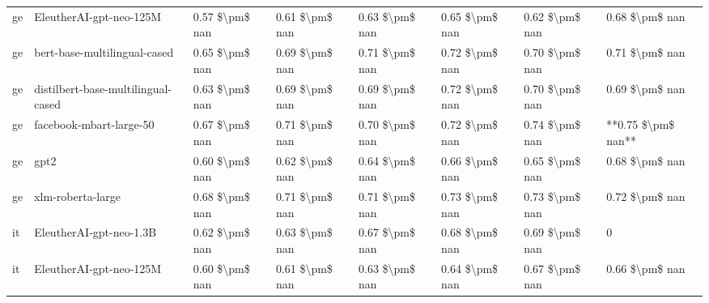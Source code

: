 \begin{tabular}{llllllll}
      ge &            EleutherAI-gpt-neo-125M & 0.57 \$\textbackslash pm\$ nan &            0.61 \$\textbackslash pm\$ nan &        0.63 \$\textbackslash pm\$ nan &         0.65 \$\textbackslash pm\$ nan &                          0.62 \$\textbackslash pm\$ nan &     0.68 \$\textbackslash pm\$ nan \\
      ge &       bert-base-multilingual-cased & 0.65 \$\textbackslash pm\$ nan &            0.69 \$\textbackslash pm\$ nan &        0.71 \$\textbackslash pm\$ nan &         0.72 \$\textbackslash pm\$ nan &                          0.70 \$\textbackslash pm\$ nan &     0.71 \$\textbackslash pm\$ nan \\
      ge & distilbert-base-multilingual-cased & 0.63 \$\textbackslash pm\$ nan &            0.69 \$\textbackslash pm\$ nan &        0.69 \$\textbackslash pm\$ nan &         0.72 \$\textbackslash pm\$ nan &                          0.70 \$\textbackslash pm\$ nan &     0.69 \$\textbackslash pm\$ nan \\
      ge &            facebook-mbart-large-50 & 0.67 \$\textbackslash pm\$ nan &            0.71 \$\textbackslash pm\$ nan &        0.70 \$\textbackslash pm\$ nan &         0.72 \$\textbackslash pm\$ nan &                          0.74 \$\textbackslash pm\$ nan & **0.75 \$\textbackslash pm\$ nan** \\
      ge &                               gpt2 & 0.60 \$\textbackslash pm\$ nan &            0.62 \$\textbackslash pm\$ nan &        0.64 \$\textbackslash pm\$ nan &         0.66 \$\textbackslash pm\$ nan &                          0.65 \$\textbackslash pm\$ nan &     0.68 \$\textbackslash pm\$ nan \\
      ge &                  xlm-roberta-large & 0.68 \$\textbackslash pm\$ nan &            0.71 \$\textbackslash pm\$ nan &        0.71 \$\textbackslash pm\$ nan &         0.73 \$\textbackslash pm\$ nan &                          0.73 \$\textbackslash pm\$ nan &     0.72 \$\textbackslash pm\$ nan \\
      it &            EleutherAI-gpt-neo-1.3B & 0.62 \$\textbackslash pm\$ nan &            0.63 \$\textbackslash pm\$ nan &        0.67 \$\textbackslash pm\$ nan &         0.68 \$\textbackslash pm\$ nan &                          0.69 \$\textbackslash pm\$ nan &                  0 \\
      it &            EleutherAI-gpt-neo-125M & 0.60 \$\textbackslash pm\$ nan &            0.61 \$\textbackslash pm\$ nan &        0.63 \$\textbackslash pm\$ nan &         0.64 \$\textbackslash pm\$ nan &                          0.67 \$\textbackslash pm\$ nan &     0.66 \$\textbackslash pm\$ nan \\

\end{tabular}
